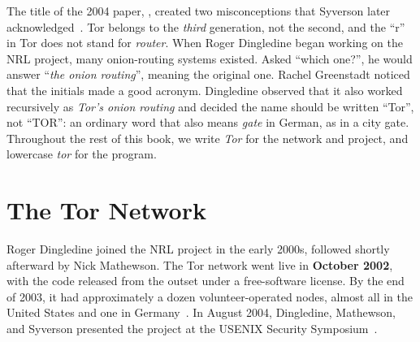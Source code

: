 \begin{storia}
The title of the 2004 paper, , created two misconceptions that Syverson later acknowledged~\cite{syverson2011peel}. Tor belongs to the \emph{third} generation, not the second, and the \enquote{r} in Tor does not stand for \emph{router}. When Roger Dingledine began working on the NRL project, many onion-routing systems existed. Asked \enquote{which one?}, he would answer \enquote{\emph{the onion routing}}, meaning the original one. Rachel Greenstadt noticed that the initials made a good acronym. Dingledine observed that it also worked recursively as \emph{Tor's onion routing} and decided the name should be written \enquote{Tor}, not \enquote{TOR}: an ordinary word that also means \emph{gate} in German, as in a city gate. Throughout the rest of this book, we write \emph{Tor} for the network and project, and lowercase \emph{tor} for the program.
\end{storia}

\section{The Tor Network}\label{sec:nascita-rete}

Roger Dingledine joined the NRL project in the early 2000s, followed shortly afterward by Nick Mathewson. The Tor network went live in \textbf{October 2002}, with the code released from the outset under a free-software license. By the end of 2003, it had approximately a dozen volunteer-operated nodes, almost all in the United States and one in Germany~\cite{torhistory}. In August 2004, Dingledine, Mathewson, and Syverson presented the project at the USENIX Security Symposium~\cite{dingledine2004tor}.

